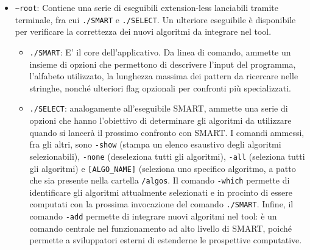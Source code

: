 \begin{itemize}
    \item \verb|~root|: Contiene una serie di eseguibili extension-less lanciabili tramite terminale, fra cui \verb|./SMART| e \verb|./SELECT|. Un ulteriore eseguibile è disponibile per verificare la correttezza dei nuovi algoritmi da integrare nel tool.
    \begin{itemize}
        \item \verb|./SMART|: E' il core dell'applicativo. Da linea di comando, ammette un insieme di opzioni che permettono di descrivere l'input del programma, l'alfabeto utilizzato, la lunghezza massima dei pattern da ricercare nelle stringhe, nonché ulteriori flag opzionali per confronti più specializzati.
        \item \verb|./SELECT|: analogamente all'eseguibile SMART, ammette una serie di opzioni che hanno l'obiettivo di determinare gli algoritmi da utilizzare quando si lancerà il prossimo confronto con SMART. I comandi ammessi, fra gli altri, sono \verb|-show| (stampa un elenco esaustivo degli algoritmi selezionabili), \verb|-none| (deseleziona tutti gli algoritmi), \verb|-all| (seleziona tutti gli algoritmi) e \verb|[ALGO_NAME]| (seleziona uno specifico algoritmo, a patto che sia presente nella cartella \verb|/algos|. Il comando \verb|-which| permette di identificare gli algoritmi attualmente selezionati e in procinto di essere computati con la prossima invocazione del comando \verb|./SMART|. Infine, il comando \verb|-add| permette di integrare nuovi algoritmi nel tool: è un comando centrale nel funzionamento ad alto livello di SMART, poiché permette a sviluppatori esterni di estenderne le prospettive computative.
        

\end{itemize}
\end{itemize}
